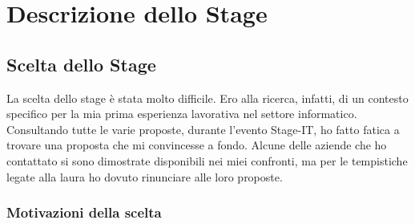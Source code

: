 
\chapter{Descrizione dello Stage}
\label{cap:descrizione-stage}


\section{Scelta dello Stage}

La scelta dello stage è stata molto difficile. Ero alla ricerca, infatti, di un contesto specifico per la mia prima esperienza lavorativa
nel settore informatico. Consultando tutte le varie proposte, durante l'evento Stage-IT, ho fatto fatica a trovare una proposta che mi
convincesse a fondo. Alcune delle aziende che ho contattato si sono dimostrate disponibili nei miei confronti, ma per le
tempistiche legate alla laura ho dovuto rinunciare alle loro proposte.

\subsection{Motivazioni della scelta}

